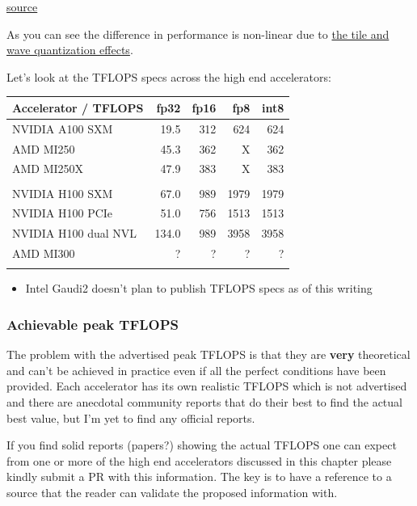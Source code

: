 \documentclass[
]{report}
\providecommand{\tightlist}{%
  \setlength{\itemsep}{0pt}\setlength{\parskip}{0pt}}\usepackage{longtable,booktabs,array}
\begin{document}
\href{https://developer.nvidia.com/blog/cuda-11-features-revealed/}{source}

As you can see the difference in performance is non-linear due to
\href{https://docs.nvidia.com/deeplearning/performance/dl-performance-matrix-multiplication/index.html\#dim-quantization}{the
tile and wave quantization effects}.

Let's look at the TFLOPS specs across the high end accelerators:

\begin{longtable}[]{@{}lrrrr@{}}
\toprule\noalign{}
Accelerator / TFLOPS & fp32 & fp16 & fp8 & int8 \\
\midrule\noalign{}
\endhead
\bottomrule\noalign{}
\endlastfoot
NVIDIA A100 SXM & 19.5 & 312 & 624 & 624 \\
AMD MI250 & 45.3 & 362 & X & 362 \\
AMD MI250X & 47.9 & 383 & X & 383 \\
& & & & \\
NVIDIA H100 SXM & 67.0 & 989 & 1979 & 1979 \\
NVIDIA H100 PCIe & 51.0 & 756 & 1513 & 1513 \\
NVIDIA H100 dual NVL & 134.0 & 989 & 3958 & 3958 \\
AMD MI300 & ? & ? & ? & ? \\
& & & & \\
\end{longtable}

\begin{itemize}
\tightlist
\item
  Intel Gaudi2 doesn't plan to publish TFLOPS specs as of this writing
\end{itemize}

\subsubsection{Achievable peak TFLOPS}\label{achievable-peak-tflops}

The problem with the advertised peak TFLOPS is that they are
\textbf{very} theoretical and can't be achieved in practice even if all
the perfect conditions have been provided. Each accelerator has its own
realistic TFLOPS which is not advertised and there are anecdotal
community reports that do their best to find the actual best value, but
I'm yet to find any official reports.

If you find solid reports (papers?) showing the actual TFLOPS one can
expect from one or more of the high end accelerators discussed in this
chapter please kindly submit a PR with this information. The key is to
have a reference to a source that the reader can validate the proposed
information with.
\end{document}
